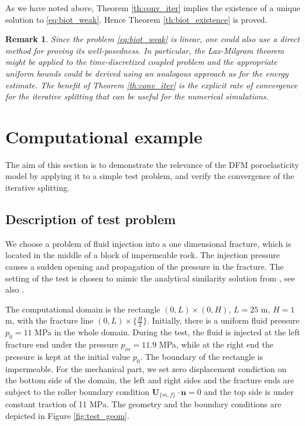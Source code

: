 \documentclass[a4paper]{article}
\newtheorem{remark}{Remark}[section]
\numberwithin{equation}{section}
\def\nn{\vc n}
\def\U{\vc U}
\def\vc#1{\mathbf{#1}}     %
\def\js#1{{\color{blue}#1}}
\begin{document}
% 
As we have noted above, Theorem \ref{th:conv_iter} implies the existence of a unique solution to \eqref{eq:biot_weak}.
Hence Theorem \ref{th:biot_existence} is proved.

\js{
\begin{remark}
Since the problem \eqref{eq:biot_weak} is linear, one could also use a direct method for proving its well-posedness.
In particular, the Lax-Milgram theorem might be applied to the time-discretized coupled problem and the appropriate uniform bounds could be derived using an analogous approach as for the energy estimate.
The benefit of Theorem \ref{th:conv_iter} is the explicit rate of convergence for the iterative splitting that can be useful for the numerical simulations.
\end{remark}
}


\section{Computational example}\label{sec:comp_test}

The aim of this section is to demonstrate the relevance of the DFM poroelasticity model by applying it to a simple test problem, and verify the convergence of the iterative splitting.

\subsection{Description of test problem}
We choose a problem of fluid injection into a one dimensional fracture, which is located in the middle of a block of impermeable rock.
The injection pressure causes a sudden opening and propagation of the pressure in the fracture.
The setting of the test is chosen to mimic the analytical similarity solution from \cite{Wijesinghe1986}, see also \cite{Watanabe2012lower}.

The computational domain is the rectangle $(0,L)\times(0,H)$, $L=25$ m, $H=1$ m, with the fracture line $(0,L)\times\{\tfrac H2\}$.
Initially, there is a uniform fluid pressure $p_0=11$ MPa in the whole domain.
During the test, the fluid is injected at the left fracture end under the pressure $p_{in}=11.9$ MPa, while at the right end the pressure is kept at the initial value $p_0$.
The boundary of the rectangle is impermeable.
For the mechanical part, we set zero displacement condiction on the bottom side of the domain, the left and right sides and the fracture ends are subject to the roller boundary condition $\U_{\{m,f\}}\cdot\nn=0$ and the top side is under constant traction of 11 MPa.
The geometry and the boundary conditions are depicted in Figure \ref{fig:test_geom}.
\end{document}

